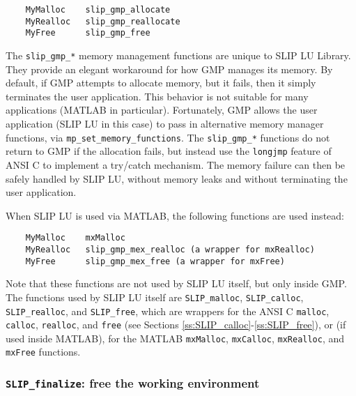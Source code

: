 \documentclass[12pt]{article}
\theoremstyle{definition}
\begin{document}
\begin{mdframed}[userdefinedwidth=6in]
{\footnotesize
\begin{verbatim}
    MyMalloc    slip_gmp_allocate
    MyRealloc   slip_gmp_reallocate
    MyFree      slip_gmp_free
\end{verbatim}
} \end{mdframed}

The \verb|slip_gmp_*| memory management functions are unique to SLIP LU
Library.  They provide an elegant workaround for how GMP manages its memory.
By default, if GMP attempts to allocate memory, but it fails, then it simply
terminates the user application.  This behavior is not suitable for many
applications (MATLAB in particular).  Fortunately, GMP allows the user
application (SLIP LU in this case) to pass in alternative memory manager
functions, via \verb|mp_set_memory_functions|.  The \verb|slip_gmp_*| functions
do not return to GMP if the allocation fails, but instead use the
\verb|longjmp| feature of ANSI C to implement a try/catch mechanism.  The
memory failure can then be safely handled by SLIP LU, without memory leaks and
without terminating the user application.

When SLIP LU is used via MATLAB, the following functions are used instead:

\begin{mdframed}[userdefinedwidth=6in]
{\footnotesize
\begin{verbatim}
    MyMalloc    mxMalloc
    MyRealloc   slip_gmp_mex_realloc (a wrapper for mxRealloc)
    MyFree      slip_gmp_mex_free (a wrapper for mxFree)
\end{verbatim}
} \end{mdframed}

Note that these functions are not used by SLIP LU itself, but only inside GMP.
The functions used by SLIP LU itself are \verb|SLIP_malloc|,
\verb|SLIP_calloc|, \verb|SLIP_realloc|, and \verb|SLIP_free|, which are
wrappers for the ANSI C \verb|malloc|, \verb|calloc|, \verb|realloc|, and
\verb|free| (see Sections \ref{ss:SLIP_calloc}-\ref{ss:SLIP_free}), or (if used
inside MATLAB), for the MATLAB \verb|mxMalloc|, \verb|mxCalloc|,
\verb|mxRealloc|, and \verb|mxFree| functions.

\cprotect\subsubsection{\verb|SLIP_finalize|: free the working environment}
\label{ss:SLIP_finalize}
\end{document}
